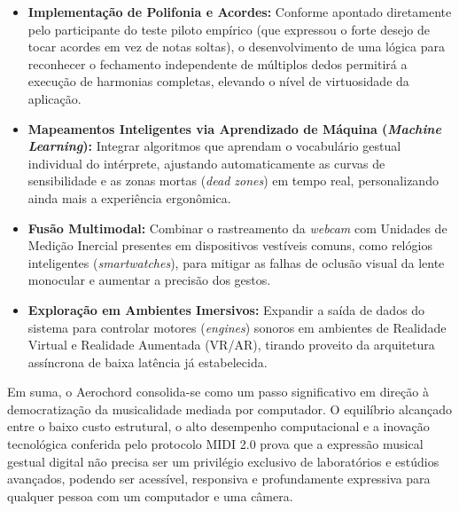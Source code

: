 \begin{itemize}
    \item \textbf{Implementação de Polifonia e Acordes:} Conforme apontado diretamente pelo participante do teste piloto empírico (que expressou o forte desejo de tocar acordes em vez de notas soltas), o desenvolvimento de uma lógica para reconhecer o fechamento independente de múltiplos dedos permitirá a execução de harmonias completas, elevando o nível de virtuosidade da aplicação.
    \item \textbf{Mapeamentos Inteligentes via Aprendizado de Máquina (\textit{Machine Learning}):} Integrar algoritmos que aprendam o vocabulário gestual individual do intérprete, ajustando automaticamente as curvas de sensibilidade e as zonas mortas (\textit{dead zones}) em tempo real, personalizando ainda mais a experiência ergonômica.
    \item \textbf{Fusão Multimodal:} Combinar o rastreamento da \textit{webcam} com Unidades de Medição Inercial presentes em dispositivos vestíveis comuns, como relógios inteligentes (\textit{smartwatches}), para mitigar as falhas de oclusão visual da lente monocular e aumentar a precisão dos gestos.
    \item \textbf{Exploração em Ambientes Imersivos:} Expandir a saída de dados do sistema para controlar motores (\textit{engines}) sonoros em ambientes de Realidade Virtual e Realidade Aumentada (VR/AR), tirando proveito da arquitetura assíncrona de baixa latência já estabelecida.
\end{itemize}

Em suma, o Aerochord consolida-se como um passo significativo em direção à democratização da musicalidade mediada por computador. O equilíbrio alcançado entre o baixo custo estrutural, o alto desempenho computacional e a inovação tecnológica conferida pelo protocolo MIDI 2.0 prova que a expressão musical gestual digital não precisa ser um privilégio exclusivo de laboratórios e estúdios avançados, podendo ser acessível, responsiva e profundamente expressiva para qualquer pessoa com um computador e uma câmera.